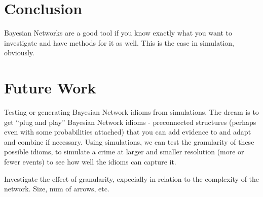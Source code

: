 \section{Conclusion}
Bayesian Networks are a good tool if you know exactly what you want to investigate and have methods for it as well. This is the case in simulation, obviously.


\section{Future Work}
Testing or generating Bayesian Network idioms from simulations. The dream is to get ``plug and play'' Bayesian Network idioms - preconnected structures (perhaps even with some probabilities attached) that you can add evidence to and adapt and combine if necessary. Using simulations, we can test the granularity of these possible idioms, to simulate a crime at larger and smaller resolution (more or fewer events) to see how well the idioms can capture it.

Investigate the effect of granularity, expecially in relation to the complexity of the network. Size, num of arrows, etc. 